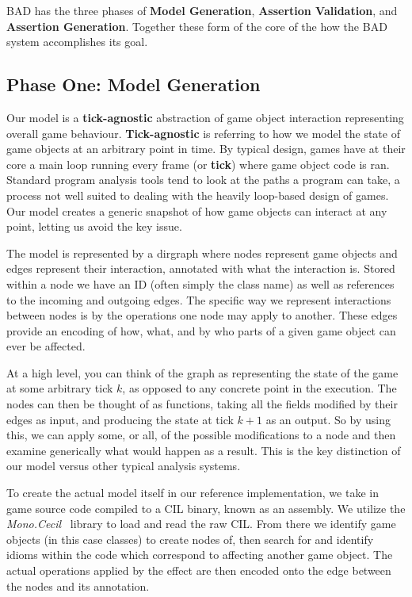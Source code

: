 \documentclass[letterpaper,twocolumn,10pt]{article}
\begin{document}
BAD has the three phases of \textbf{Model Generation}, \textbf{Assertion Validation}, and \textbf{Assertion Generation}. Together these form of the core of the how the BAD system accomplishes its goal. 

\subsection{Phase One: Model Generation}

Our model is a \textbf{tick-agnostic} abstraction of game object interaction representing overall game behaviour. \textbf{Tick-agnostic} is referring to how we model the state of game objects at an arbitrary point in time. By typical design, games have at their core a main loop running every frame (or \textbf{tick}) where game object code is ran. Standard program analysis tools tend to look at the paths a program can take, a process not well suited to dealing with the heavily loop-based design of games. Our model creates a generic snapshot of how game objects can interact at any point, letting us avoid the key issue.

The model is represented by a dirgraph where nodes represent game objects and edges represent their interaction, annotated with what the interaction is. Stored within a node we have an ID (often simply the class name) as well as references to the incoming and outgoing edges. The specific way we represent interactions between nodes is by the operations one node may apply to another. These edges provide an encoding of how, what, and by who parts of a given game object can ever be affected. 

At a high level, you can think of the graph as representing the state of the game at some arbitrary tick $k$, as opposed to any concrete point in the execution. The nodes can then be thought of as functions, taking all the fields modified by their edges as input, and producing the state at tick $k + 1$ as an output. So by using this, we can apply some, or all, of the possible modifications to a node and then examine generically what would happen as a result. This is the key distinction of our model versus other typical analysis systems.

To create the actual model itself in our reference implementation, we take in game source code compiled to a CIL binary, known as an assembly. We utilize the \textit{Mono.Cecil}~\cite{Mono.Cecil} library to load and read the raw CIL. From there we identify game objects (in this case classes) to create nodes of, then search for and identify idioms within the code which correspond to affecting another game object. The actual operations applied by the effect are then encoded onto the edge between the nodes and its annotation. 
\end{document}
